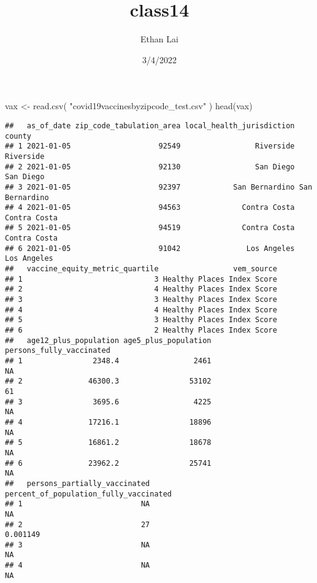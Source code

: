 \documentclass[
]{article}
\title{class14}
\author{Ethan Lai}
\date{3/4/2022}
\newenvironment{Shaded}{\begin{snugshade}}{\end{snugshade}}
\newcommand{\FunctionTok}[1]{\textcolor[rgb]{0.00,0.00,0.00}{#1}}
\newcommand{\NormalTok}[1]{#1}
\newcommand{\OtherTok}[1]{\textcolor[rgb]{0.56,0.35,0.01}{#1}}
\newcommand{\StringTok}[1]{\textcolor[rgb]{0.31,0.60,0.02}{#1}}
\begin{document}
\maketitle

\begin{Shaded}
\begin{Highlighting}[]
\NormalTok{vax }\OtherTok{\textless{}{-}} \FunctionTok{read.csv}\NormalTok{( }\StringTok{"covid19vaccinesbyzipcode\_test.csv"}\NormalTok{ )}
\FunctionTok{head}\NormalTok{(vax)}
\end{Highlighting}
\end{Shaded}

\begin{verbatim}
##   as_of_date zip_code_tabulation_area local_health_jurisdiction         county
## 1 2021-01-05                    92549                 Riverside      Riverside
## 2 2021-01-05                    92130                 San Diego      San Diego
## 3 2021-01-05                    92397            San Bernardino San Bernardino
## 4 2021-01-05                    94563              Contra Costa   Contra Costa
## 5 2021-01-05                    94519              Contra Costa   Contra Costa
## 6 2021-01-05                    91042               Los Angeles    Los Angeles
##   vaccine_equity_metric_quartile                 vem_source
## 1                              3 Healthy Places Index Score
## 2                              4 Healthy Places Index Score
## 3                              3 Healthy Places Index Score
## 4                              4 Healthy Places Index Score
## 5                              3 Healthy Places Index Score
## 6                              2 Healthy Places Index Score
##   age12_plus_population age5_plus_population persons_fully_vaccinated
## 1                2348.4                 2461                       NA
## 2               46300.3                53102                       61
## 3                3695.6                 4225                       NA
## 4               17216.1                18896                       NA
## 5               16861.2                18678                       NA
## 6               23962.2                25741                       NA
##   persons_partially_vaccinated percent_of_population_fully_vaccinated
## 1                           NA                                     NA
## 2                           27                               0.001149
## 3                           NA                                     NA
## 4                           NA                                     NA

\end{verbatim}
\end{document}
